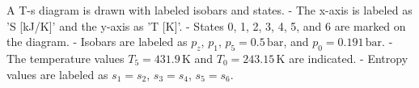 A T-s diagram is drawn with labeled isobars and states.  
- The x-axis is labeled as 'S [kJ/K]' and the y-axis as 'T [K]'.  
- States 0, 1, 2, 3, 4, 5, and 6 are marked on the diagram.  
- Isobars are labeled as \( p_z \), \( p_1 \), \( p_5 = 0.5 \, \text{bar} \), and \( p_0 = 0.191 \, \text{bar} \).  
- The temperature values \( T_5 = 431.9 \, \text{K} \) and \( T_0 = 243.15 \, \text{K} \) are indicated.  
- Entropy values are labeled as \( s_1 = s_2 \), \( s_3 = s_4 \), \( s_5 = s_6 \).